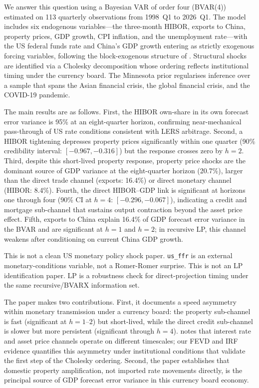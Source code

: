 \documentclass[12pt,a4paper]{article}
\begin{document}
We answer this question using a Bayesian VAR of order four (BVAR(4)) estimated on
113 quarterly observations from 1998~Q1 to 2026~Q1. The model includes six
endogenous variables---the three-month HIBOR, exports to China, property prices,
GDP growth, CPI inflation, and the unemployment rate---with the US federal funds
rate and China's GDP growth entering as strictly exogenous forcing variables,
following the block-exogenous structure of \citet{CushmanZha1997}. Structural
shocks are identified via a Cholesky decomposition whose ordering reflects
institutional timing under the currency board. The Minnesota prior regularises
inference over a sample that spans the Asian financial crisis, the global
financial crisis, and the COVID-19 pandemic.

The main results are as follows. First, the HIBOR own-share in its own forecast
error variance is 95\% at an eight-quarter horizon, confirming near-mechanical
pass-through of US rate conditions consistent with LERS arbitrage. Second, a
HIBOR tightening depresses property prices significantly within one quarter
(90\% credibility interval: $[-0.967, -0.316]$) but the response crosses zero
by $h = 2$. Third, despite this short-lived property response, property price
shocks are the dominant source of GDP variance at the eight-quarter horizon
(20.7\%), larger than the direct trade channel (exports: 16.4\%) or direct
monetary channel (HIBOR: 8.4\%). Fourth, the direct HIBOR--GDP link is
significant at horizons one through four (90\% CI at $h = 4$: $[-0.296, -0.067]$),
indicating a credit and mortgage sub-channel that sustains output contraction
beyond the asset price effect. Fifth, exports to China explain 16.4\% of GDP
forecast error variance in the BVAR and are significant at $h = 1$ and $h = 2$;
in recursive LP, this channel weakens after conditioning on current China GDP
growth.

This is not a clean US monetary policy shock paper. \texttt{us\_ffr} is an
external monetary-conditions variable, not a Romer-Romer surprise. This is not an
LP identification paper. LP is a robustness check for direct-projection timing
under the same recursive/BVARX information set.

The paper makes two contributions. First, it documents a speed asymmetry within
monetary transmission under a currency board: the property sub-channel is fast
(significant at $h = 1$--$2$) but short-lived, while the direct credit sub-channel
is slower but more persistent (significant through $h = 4$). \citet{Mishkin1996}
notes that interest rate and asset price channels operate on different timescales;
our FEVD and IRF evidence quantifies this asymmetry under institutional conditions
that validate the first step of the Cholesky ordering. Second, the paper
establishes that domestic property amplification, not imported rate movements
directly, is the principal source of GDP forecast error variance in this currency
board economy.
\end{document}
